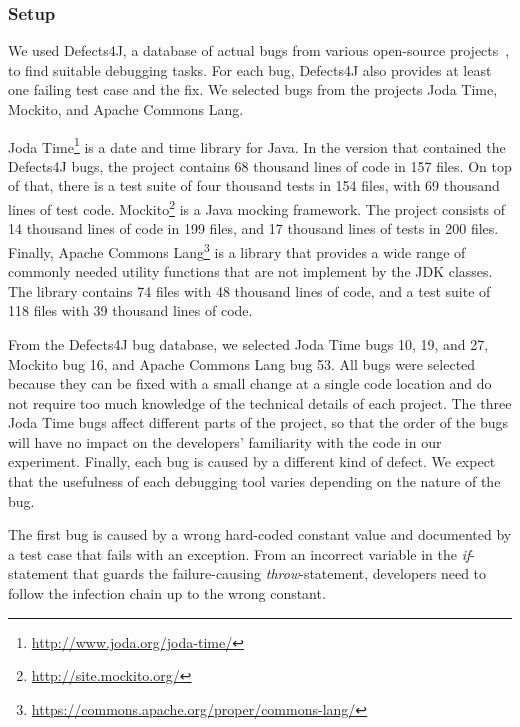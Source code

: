 \subsubsection{Setup}

We used Defects4J, a database of actual bugs from various open-source projects~\cite{just14:defects4j_a_database}, to find suitable debugging tasks.
For each bug, Defects4J also provides at least one failing test case and the fix.
We selected bugs from the projects Joda Time, Mockito, and Apache Commons Lang.

Joda Time\footnote{\url{http://www.joda.org/joda-time/}} is a date and time library for Java.
In the version that contained the Defects4J bugs, the project contains 68 thousand lines of code in 157 files.
On top of that, there is a test suite of four thousand tests in 154 files, with 69 thousand lines of test code.
Mockito\footnote{\url{http://site.mockito.org/}} is a Java mocking framework.
The project consists of 14 thousand lines of code in 199 files, and 17 thousand lines of tests in 200 files.
Finally, Apache Commons Lang\footnote{\url{https://commons.apache.org/proper/commons-lang/}} is a library that provides a wide range of commonly needed utility functions that are not implement by the JDK classes.
The library contains 74 files with 48 thousand lines of code, and a test suite of 118 files with 39 thousand lines of code.



From the Defects4J bug database, we selected Joda Time bugs 10, 19, and 27, Mockito bug 16, and Apache Commons Lang bug 53.
All bugs were selected because they can be fixed with a small change at a single code location and do not require too much knowledge of the technical details of each project.
The three Joda Time bugs affect different parts of the project, so that the order of the bugs will have no impact on the developers' familiarity with the code in our experiment.
Finally, each bug is caused by a different kind of defect.
We expect that the usefulness of each debugging tool varies depending on the nature of the bug.

The first bug is caused by a wrong hard-coded constant value and documented by a test case that fails with an exception.
From an incorrect variable in the \emph{if}-statement that guards the failure-causing \emph{throw}-statement, developers need to follow the infection chain up to the wrong constant.

